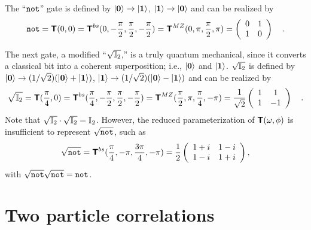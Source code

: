 {The ``${\tt not}$'' gate is defined by
$\vert  {\bf 0}  \rangle  \rightarrow  \vert  {\bf 1}  \rangle $,
$\vert  {\bf 1}  \rangle  \rightarrow  \vert  {\bf 0}  \rangle $ and can be realized by
\begin{equation}
{\tt not} =
\textsf{\textbf{T}}(0,0)=
\textsf{\textbf{T}}^{bs}(0,-{\pi \over 2},{\pi \over 2},-{\pi \over 2})=
\textsf{\textbf{T}}^{MZ}(0,\pi ,{\pi \over 2} ,\pi )
=
\left(
\begin{array}{cc}
0&1
\\
1&0
 \end{array}
\right)
\quad .
\end{equation}


The next gate, a modified ``$\sqrt{{\Bbb I}_2}$,'' is a truly quantum
mechanical, since it converts a classical bit
into
a coherent superposition; i.e., $\vert  {\bf 0}  \rangle $ and $\vert  {\bf 1}  \rangle $.
$\sqrt{{\Bbb I}_2}$ is defined by
$\vert  {\bf 0}  \rangle  \rightarrow  (1/\sqrt{2})(\vert  {\bf 0}  \rangle  + \vert  {\bf 1}  \rangle )$,
$\vert  {\bf 1}  \rangle  \rightarrow  (1/\sqrt{2})(\vert  {\bf 0}  \rangle  - \vert  {\bf 1}  \rangle )$ and can
be realized by
\begin{equation}
\sqrt{{\Bbb I}_2} =
\textsf{\textbf{T}}({\pi \over 4},0)=
\textsf{\textbf{T}}^{bs}({\pi \over 4},-{\pi \over 2},{\pi \over 2},-{\pi \over 2})=
\textsf{\textbf{T}}^{MZ}({\pi \over 2},\pi ,{\pi \over 4} ,-\pi )
=
{1 \over \sqrt{2}}
\left(
\begin{array}{cc}
1&1
\\
1&-1
 \end{array}
\right)
\quad .
\end{equation}
Note that $\sqrt{{\Bbb I}_2}\cdot \sqrt{{\Bbb I}_2} = {\Bbb I}_2$.
However, the reduced parameterization of $\textsf{\textbf{T}}(\omega,\phi)$
is insufficient to represent $\sqrt{{\tt not}}$, such as
\begin{equation}
\sqrt{{\tt not}} =
\textsf{\textbf{T}}^{bs}({\pi \over 4},-\pi ,
{3\pi \over 4},
-\pi )=
{1 \over 2}
\left(
\begin{array}{cc}
1+i&1-i
\\
1-i&1+i
 \end{array}
\right)
,
\end{equation}
with
$
\sqrt{{\tt not}}
\sqrt{{\tt not}} = {\tt not}$.


\section{Two particle correlations}

}
